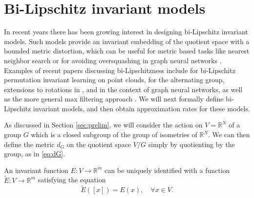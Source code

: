 \documentclass[twoside,11pt]{article}
\newcommand{\RR}{\mathbb{R}}
\begin{document}
\section{Bi-Lipschitz invariant models}\label{sec:bilip}
In recent years there has been growing interest in designing bi-Lipschitz invariant models. Such models provide an invariant embedding of the quotient space with a bounded metric distortion, which can be useful for metric based tasks like nearest neighbor search \cite{cahill2024towards} or for avoiding oversquashing in graph neural networks \cite{fswgnn}. Examples of recent papers discussing bi-Lipschitzness include \cite{balan2022permutation,amir2024fsw} for bi-Lipschitz permutation invariant learning on point clouds, \cite{Mizrachi} for the alternating group,  extensions to rotations in \cite{sverdlov2025toward}, and \cite{davidson2024,fswgnn} in the context of graph neural networks, as well as the more general max filtering approach \cite{cahill2024group}.  We will next formally define bi-Lipschitz invariant models, and then obtain approximation rates for these models.  

As discussed in Section \ref{sec:prelim}, we will consider the action on $V=\RR^N$ of a group $G$ which is a closed subgroup of the group of isometries of $\RR^N$. We can then define the metric $d_G$ on the quotient space $V/G $ simply by quotienting by the group, as in \eqref{eq:dG}. 


An invariant function $E:V\to \RR^m$ can be uniquely identified with a function $\tilde E:V \to \RR^m$ satisfying the equation 
$$\tilde E([x])=E(x), \quad \forall x\in V .$$
\end{document}
